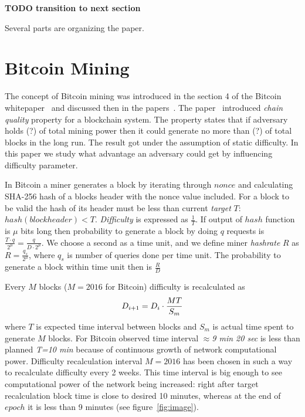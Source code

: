 \documentclass[]{llncs}
\begin{document}
\textbf{TODO transition to next section}

Several parts are organizing the paper. 

\section{Bitcoin Mining}
\label{sec:bit}

The concept of Bitcoin mining was introduced in the section 4 of the Bitcoin whitepaper~\cite{Nakamoto2008} and discussed then in the papers~\cite{kraft2015difficulty, miller2014permacoin, eyal2014majority, garay2015bitcoin}. The paper~\cite{garay2015bitcoin} introduced \textit{chain quality} property for a blockchain system. The property states that if adversary holds (?) of total mining power then it could generate no more than (?) of total blocks in the long run. The result got under the assumption of static difficulty. In this paper we study what advantage an adversary could get by influencing difficulty parameter.

In Bitcoin a miner generates a block by iterating through \(nonce\) and calculating SHA-256 hash of a blocks header with the nonce value included.
For a block to be valid the hash of its header must be less than current \textit{target} \(T\): \( hash(blockheader) < T \). \textit{Difficulty} is expressed as \(\frac{1}{T}\). If output of \(hash\) function is \(\mu\) bits long then probability to generate a block by doing \(q\) requests is \(\frac{T \cdot q}{2^\mu} = \frac{q}{D \cdot 2^\mu}\). We choose a second as a time unit, and we define miner \textit{hashrate} \(R\) as \(R = \frac{q_s}{2^\mu}\), where \(q_s\) is number of queries done per time unit. The probability to generate a block within time unit then is \(\frac{R}{D}\)


Every \(M\) blocks (\(M=2016\) for Bitcoin) difficulty is recalculated as
\begin{equation}
D_{i+1}=D_i \cdot {MT\over S_m}
\end{equation}
where \(T\) is expected time interval between blocks and \(S_m\) is actual time spent to generate \(M\) blocks.
For Bitcoin observed time interval $\approx$\textit{9 min 20 sec} is less than planned \textit{T=10 min} because of continuous growth of network computational power.
Difficulty recalculation interval \(M=2016\) has been chosen in such a way to recalculate difficulty every 2 weeks.
This time interval is big enough to see computational power of the network being increased: right after target recalculation block time is close to desired 10 minutes, whereas at the end of \(epoch\) it is less than 9 minutes (see figure~\ref{fig:image}).
\end{document}
